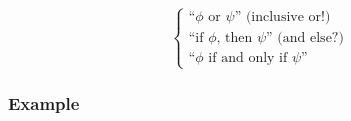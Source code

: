 \begin{frame}{\myframetitle}
\begin{mycolumns}
{\begin{equation*}
\begin{cases}
					\text{``$\phi$ or $\psi$'' (inclusive or!)} \\
					\text{``if $\phi$, then $\psi$'' (and else?)} \\
					\text{``$\phi$ if and only if $\psi$''}
				\end{cases}
			\end{equation*}
		}
	\end{mycolumns}
\end{frame}

\subsubsection*{Example}

